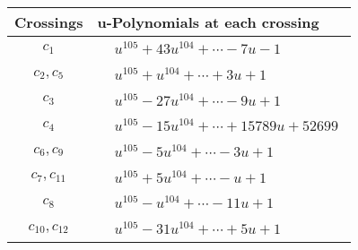 \documentclass[1p]{elsarticle_modified}
\theoremstyle{definition}
\begin{document}
\begin{tabular}{m{50pt}|m{274pt}}
Crossings & \hspace{64pt}u-Polynomials at each crossing \\
\hline $$\begin{aligned}c_{1}\end{aligned}$$&$\begin{aligned}
&u^{105}+43 u^{104}+\cdots-7 u-1
\end{aligned}$\\
\hline $$\begin{aligned}c_{2},c_{5}\end{aligned}$$&$\begin{aligned}
&u^{105}+u^{104}+\cdots+3 u+1
\end{aligned}$\\
\hline $$\begin{aligned}c_{3}\end{aligned}$$&$\begin{aligned}
&u^{105}-27 u^{104}+\cdots-9 u+1
\end{aligned}$\\
\hline $$\begin{aligned}c_{4}\end{aligned}$$&$\begin{aligned}
&u^{105}-15 u^{104}+\cdots+15789 u+52699
\end{aligned}$\\
\hline $$\begin{aligned}c_{6},c_{9}\end{aligned}$$&$\begin{aligned}
&u^{105}-5 u^{104}+\cdots-3 u+1
\end{aligned}$\\
\hline $$\begin{aligned}c_{7},c_{11}\end{aligned}$$&$\begin{aligned}
&u^{105}+5 u^{104}+\cdots- u+1
\end{aligned}$\\
\hline $$\begin{aligned}c_{8}\end{aligned}$$&$\begin{aligned}
&u^{105}- u^{104}+\cdots-11 u+1
\end{aligned}$\\
\hline $$\begin{aligned}c_{10},c_{12}\end{aligned}$$&$\begin{aligned}
&u^{105}-31 u^{104}+\cdots+5 u+1
\end{aligned}$\\
\hline
\end{tabular}\\~\\
\end{document}
